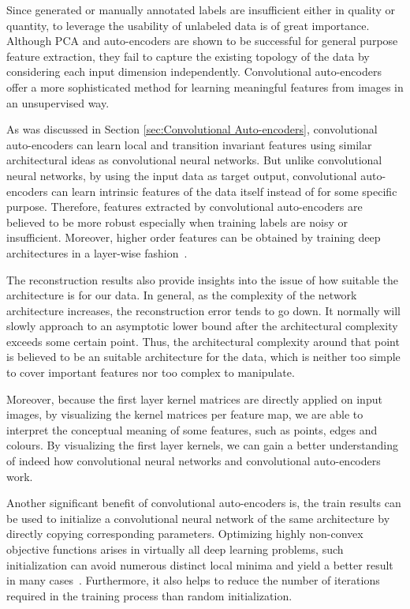 Since generated or manually annotated labels are insufficient either in  quality or quantity, to leverage the usability of unlabeled data is of great importance. Although PCA and auto-encoders are shown to be successful for general purpose feature extraction, they fail to capture the existing topology of the data by considering each input dimension independently. Convolutional auto-encoders offer a more sophisticated method for learning meaningful features from images in an unsupervised way. 

As was discussed in Section \ref{sec:Convolutional Auto-encoders}, convolutional auto-encoders can learn local and transition invariant features using similar architectural ideas as convolutional neural networks. But unlike convolutional neural networks, by using the input data as target output, convolutional auto-encoders can learn intrinsic features of the data itself instead of for some specific purpose. Therefore, features extracted by convolutional auto-encoders are believed to be more robust especially when training labels are noisy or insufficient. Moreover, higher order features can be obtained by training deep architectures in a layer-wise fashion~\cite{masci2011stacked}.

The reconstruction results also provide insights into the issue of how suitable the architecture is for our data. In general, as the complexity of the network architecture increases, the reconstruction error tends to go down. It normally will slowly approach to an asymptotic lower bound after the architectural complexity exceeds some certain point. Thus, the architectural complexity around that point is believed to be an suitable architecture for the data, which is neither too simple to cover important features nor too complex to manipulate.

Moreover, because the first layer kernel matrices are directly applied on input images, by visualizing the kernel matrices per feature map, we are able to interpret the conceptual meaning of some features, such as points, edges and colours. By visualizing the first layer kernels, we can gain a better understanding of indeed how convolutional neural networks and convolutional auto-encoders work.

Another significant benefit of convolutional auto-encoders is, the train results can be used to initialize a convolutional neural network of the same architecture by directly copying corresponding parameters. Optimizing highly non-convex objective functions arises in virtually all deep learning problems, such initialization can avoid numerous distinct local minima and yield a better result in many cases~\cite{masci2011stacked}. Furthermore, it also helps to reduce the number of iterations required in the training process than random initialization. 

